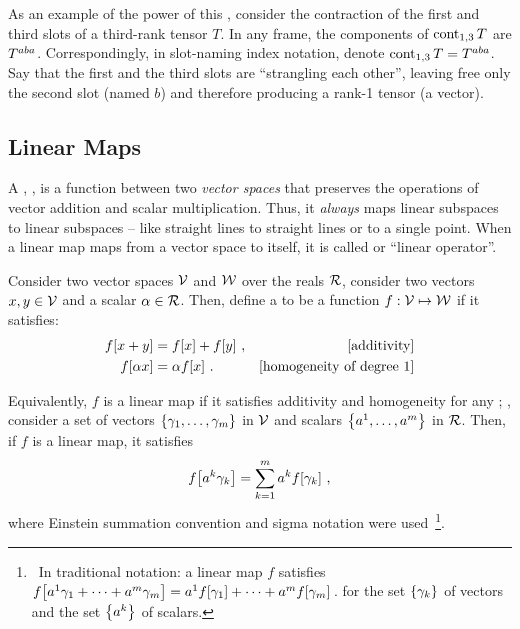 As an example of the power of this , consider the contraction of the first and third slots of a third-rank tensor $T$. In any frame, the components of $\operatorname{cont}_{1,3}T$ are ${T}^{aba}$. Correspondingly, in slot-naming index notation, denote $\operatorname{cont}_{1,3}T = {T}^{aba}$. Say that the first and the third slots are ``strangling each other'', leaving free only the second slot (named $b$) and therefore producing a rank-1 tensor (a vector).


\subsection{Linear Maps}
A , \aka {}, is a function between two \emph{vector spaces} that preserves the operations of vector addition and scalar multiplication. Thus, it \emph{always} maps linear subspaces to linear subspaces -- like straight lines to straight lines or to a single point. When a linear map maps from a vector space to itself, it is called  or ``linear operator''.

\begin{definition}
Consider two vector spaces $\mathcal{V}$ and $\mathcal{W}$ over the reals $\mathcal{R}$, consider two vectors $x,y\in\mathcal{V}$ and a scalar $\alpha\in\mathcal{R}$. Then, define a  to be a function ${f}:{\mathcal{V}}\mapsto{\mathcal{W}}$ if it satisfies:
\begin{align*}\label{eq:linearfunction}
f\!\left[{x + y}\right]    &= f\!\left[{x}\right] + f\!\left[{y}\right] \,, &\text{[{additivity}]}\\
f\!\left[{\alpha x}\right] &= \alpha f\!\left[{x}\right]    \,. &\text{[{homogeneity of degree 1}]}
\end{align*}
\end{definition}

Equivalently, $f$ is a linear map if it satisfies additivity and homogeneity for any ; \ie, consider a set of vectors $\left\lbrace{\gamma_{1}, \dotsc, \gamma_{m}}\right\rbrace$ in $\mathcal{V}$ and scalars $\left\lbrace{{a}^{1}, \dotsc, {a}^{m}}\right\rbrace$ in $\mathcal{R}$. Then, if $f$ is a linear map, it satisfies
\begin{equation}\label{eq:linearfunctioncombination}
f\!\left[{{a}^{k}\gamma_{k}}\right] = \sum_{k = 1}^{m}{a}^{k} f\!\left[{\gamma_{k}}\right] \,,
\end{equation}
where Einstein summation convention and sigma notation were used~\footnote{~In traditional notation: a linear map $f$ satisfies $f\!\left[{{a}^{1}\gamma_{1} + \dotsb + {a}^{m}\gamma_{m}}\right] = {a}^{1} f\!\left[{\gamma_{1}}\right] + \dotsb + {a}^{m} f\!\left[{\gamma_{m}}\right]$\,. for the set $\left\lbrace{\gamma_{k}}\right\rbrace$ of vectors and the set $\left\lbrace{{a}^{k}}\right\rbrace$ of scalars.}.


